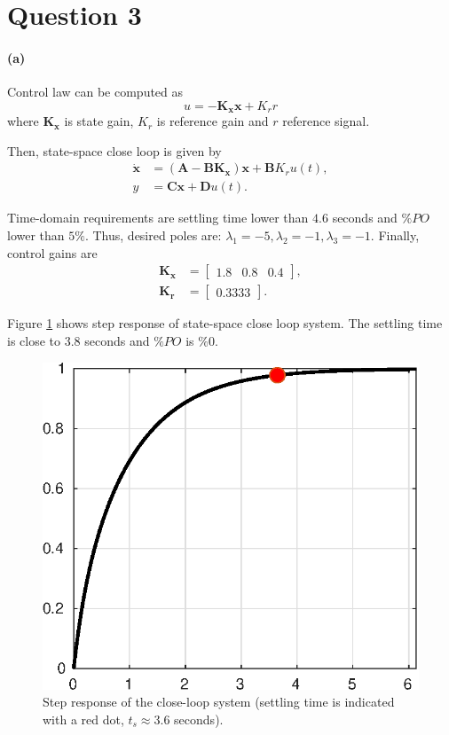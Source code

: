 \section{Question 3}
\paragraph{(a)} Control law can be computed as
\begin{equation}
	u = -\mathbf{K_x x} + K_r r
\end{equation}
\noindent where $\mathbf{K_x}$ is state gain, $K_r$ is reference gain and $r$ reference signal.

Then, state-space close loop is given by
\begin{align*}
\mathbf{\dot{x}} &= (\mathbf{A}-\mathbf{B K_x})\mathbf{x} + \mathbf{B} K_r u(t), \\
y &= \mathbf{C} \mathbf{x} + \mathbf{D} u(t).
\end{align*}

Time-domain requirements are settling time lower than $4.6$ seconds and $\%PO$ lower than $5\%$. Thus, desired poles are: $\lambda_1 = -5, \lambda_2 = -1, \lambda_3 = -1$. Finally, control gains are
\begin{align*}
\mathbf{K_x} &= 
\begin{bmatrix}
1.8 & 0.8 & 0.4
\end{bmatrix}, \\
\mathbf{K_r} &= 
\begin{bmatrix}
0.3333
\end{bmatrix}.
\end{align*}

Figure \ref{fig:step_response} shows step response of state-space close loop system. The settling time is close to $3.8$ seconds and $\%PO$ is $\%0$.

\begin{figure}[H]
\centering
\includegraphics{images/step_response.eps}
\caption{Step response of the close-loop system (settling time is indicated with a red dot, $t_s \approx 3.6$ seconds).}
\label{fig:step_response}
\end{figure}











